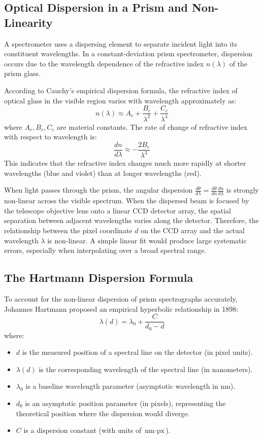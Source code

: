 \documentclass[12pt, a4paper]{article}
\begin{document}
\subsection{Optical Dispersion in a Prism and Non-Linearity}
A spectrometer uses a dispersing element to separate incident light into its constituent wavelengths. In a constant-deviation prism spectrometer, dispersion occurs due to the wavelength dependence of the refractive index $n(\lambda)$ of the prism glass.

According to Cauchy's empirical dispersion formula, the refractive index of optical glass in the visible region varies with wavelength approximately as:
\begin{equation}
    n(\lambda) \approx A_c + \frac{B_c}{\lambda^2} + \frac{C_c}{\lambda^4}
\end{equation}
where $A_c, B_c, C_c$ are material constants. The rate of change of refractive index with respect to wavelength is:
\begin{equation}
    \frac{dn}{d\lambda} \approx - \frac{2 B_c}{\lambda^3}
\end{equation}
This indicates that the refractive index changes much more rapidly at shorter wavelengths (blue and violet) than at longer wavelengths (red). 

When light passes through the prism, the angular dispersion $\frac{d\theta}{d\lambda} = \frac{d\theta}{dn} \frac{dn}{d\lambda}$ is strongly non-linear across the visible spectrum. When the dispersed beam is focused by the telescope objective lens onto a linear CCD detector array, the spatial separation between adjacent wavelengths varies along the detector. Therefore, the relationship between the pixel coordinate $d$ on the CCD array and the actual wavelength $\lambda$ is non-linear. A simple linear fit would produce large systematic errors, especially when interpolating over a broad spectral range.

\subsection{The Hartmann Dispersion Formula}
To account for the non-linear dispersion of prism spectrographs accurately, Johannes Hartmann proposed an empirical hyperbolic relationship in 1898:
\begin{equation}
    \lambda(d) = \lambda_0 + \frac{C}{d_0 - d}
    \label{eq:hartmann}
\end{equation}
where:
\begin{itemize}
    \item $d$ is the measured position of a spectral line on the detector (in pixel units).
    \item $\lambda(d)$ is the corresponding wavelength of the spectral line (in nanometers).
    \item $\lambda_0$ is a baseline wavelength parameter (asymptotic wavelength in nm).
    \item $d_0$ is an asymptotic position parameter (in pixels), representing the theoretical position where the dispersion would diverge.
    \item $C$ is a dispersion constant (with units of $\text{nm}\cdot\text{px}$).
\end{itemize}
\end{document}
